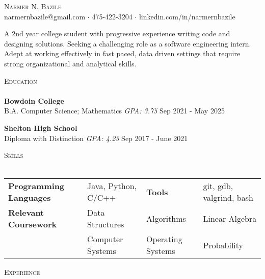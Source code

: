 \documentclass[letterpaper]{article}
\newcommand{\lineunder} {
    \vspace*{-8pt} \\
    \hspace*{-18pt} \hrulefill \\
}
\newcommand{\header} [1] {
    {\hspace*{-18pt}\vspace*{6pt} \textsc{#1}}
    \vspace*{-6pt} \lineunder
}
\begin{document}
\vspace*{-40pt}

    

\vspace*{-10pt}
\begin{center}
	{\LARGE \scshape {Narmer N. Bazile}}\\
    \vspace{2mm}
	narmernbazile@gmail.com $\cdot$ 475-422-3204 $\cdot$ linkedin.com/in/narmernbazile\\
\end{center}
\vspace{0.5mm}

A 2nd year college student with progressive experience writing code and designing solutions. Seeking a challenging role as a software engineering intern. Adept at working effectively in fast paced, data driven settings that require strong organizational and analytical skills.
\vspace{2mm}

\header{Education}
\textbf{Bowdoin College}\\
B.A. Computer Science; Mathematics \textit{GPA: 3.75} \hfill Sep 2021 - May 2025\\
\vspace{0.5mm}


\textbf{Shelton High School}\\
Diploma with Distinction \textit{GPA: 4.23} \hfill Sep 2017 - June 2021\\
\vspace{2mm}

\header{Skills}
\vspace{1mm}

\begin{tabular}{l l l l }

    \vspace{2mm}
	\textbf{Programming Languages} & \hfill Java, Python, C/C++ & \textbf{Tools} & \hfill git, gdb, valgrind, bash\\
    \textbf{Relevant Coursework} & Data Structures  & Algorithms & Linear Algebra\\
                                 & Computer Systems & Operating Systems & Probability\\
\end{tabular}

\header{Experience}
\vspace{1mm}
\end{document}
